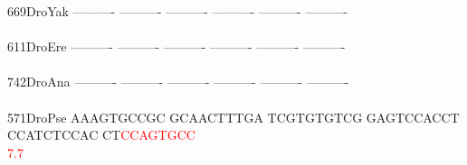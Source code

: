 \documentclass[11pt,twoside,reqno,a4paper]{article}
\begin{document}
{669\hspace*{2\charwidth}DroYak	----------	----------	----------	----------	----------	----------	\\
\hspace*{5\charwidth}\hspace*{7\charwidth}\hspace*{1\charwidth}\hspace*{1\charwidth}\hspace*{1\charwidth}\hspace*{1\charwidth}\hspace*{1\charwidth}\hspace*{1\charwidth}\\
611\hspace*{2\charwidth}DroEre	----------	----------	----------	----------	----------	----------	\\
\hspace*{5\charwidth}\hspace*{7\charwidth}\hspace*{1\charwidth}\hspace*{1\charwidth}\hspace*{1\charwidth}\hspace*{1\charwidth}\hspace*{1\charwidth}\hspace*{1\charwidth}\\
742\hspace*{2\charwidth}DroAna	----------	----------	----------	----------	----------	----------	\\
\hspace*{5\charwidth}\hspace*{7\charwidth}\hspace*{1\charwidth}\hspace*{1\charwidth}\hspace*{1\charwidth}\hspace*{1\charwidth}\hspace*{1\charwidth}\hspace*{1\charwidth}\\
571\hspace*{2\charwidth}DroPse	AAAGTGCCGC	GCAACTTTGA	TCGTGTGTCG	GAGTCCACCT	CCATCTCCAC	CT\textcolor{Red}{C}\textcolor{Red}{C}\textcolor{Red}{A}\textcolor{Red}{G}\textcolor{Red}{T}\textcolor{Red}{G}\textcolor{Red}{C}\textcolor{Red}{C}	\\
\hspace*{5\charwidth}\hspace*{7\charwidth}\hspace*{1\charwidth}\hspace*{1\charwidth}\hspace*{1\charwidth}\hspace*{1\charwidth}\hspace*{1\charwidth}\hspace*{52\charwidth}\textcolor{Red}{7.7}\hspace*{1\charwidth}\\
}
\end{document}
